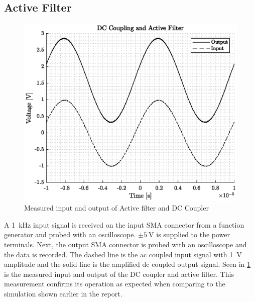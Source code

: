 \subsection{Active Filter}
\begin{figure}
	\centering
	\includegraphics[width=.8\textwidth]{Figures/5_dccoupler_filter_measurement.eps}
	\caption{Measured input and output of Active filter and DC Coupler}
	\label{fig:5_dccoupler_measured}
\end{figure}
A \qty{1}{\kilo\hertz} input signal is received on the input SMA connector from a function generator and probed with an oscilloscope. $\pm\qty{5}{\volt}$ is supplied to the power terminals. Next, the output SMA connector is probed with an oscilloscope and the data is recorded. The dashed line is the \gls{ac} coupled input signal with \qty{1}{\volt} amplitude and the solid line is the amplified \gls{dc} coupled output signal. Seen in \cref{fig:5_dccoupler_measured} is the measured input and output of the DC coupler and active filter. This measurement confirms its operation as expected when comparing to the simulation shown earlier in the report.


